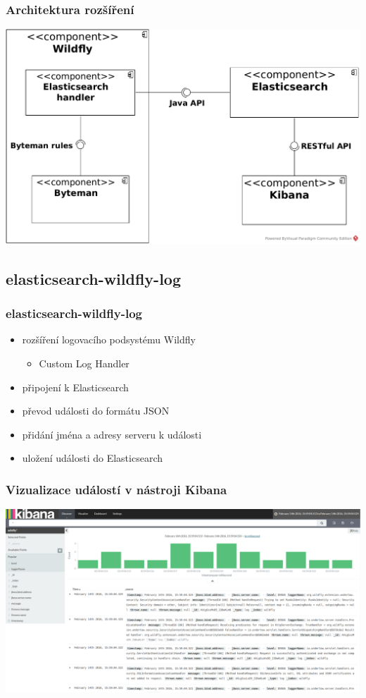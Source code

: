 \documentclass{beamer}
\begin{document}
\begin{frame}
\frametitle{Architektura rozšíření}
\includegraphics[width=\textwidth]{../images/component_diagram}
\end{frame}


\subsection{elasticsearch-wildfly-log}

\begin{frame}
	\frametitle{elasticsearch-wildfly-log}
	\begin{itemize}
		\item rozšíření logovacího podsystému Wildfly
		\begin{itemize}
			\item Custom Log Handler
		\end{itemize}
		\item připojení k Elasticsearch
		\item převod události do formátu JSON
		\item přidání jména a adresy serveru k události
		\item uložení události do Elasticsearch
	\end{itemize}
\end{frame}

\begin{frame}
\frametitle{Vizualizace událostí v nástroji Kibana}
\includegraphics[width=\textwidth]{kibana}
\end{frame}
\end{document}
